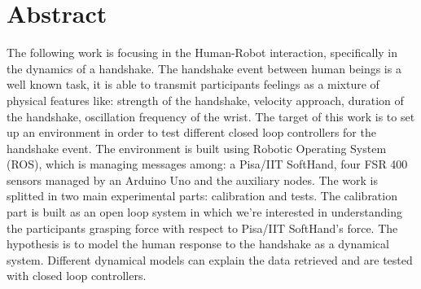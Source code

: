 
\chapter*{Abstract}
\begin{center}

\end{center}
\vspace{60px}
The following work is focusing in the Human-Robot interaction, specifically in the dynamics of a handshake. The handshake event between human beings is a well known task, it is able to transmit participants feelings as a mixture of physical features like: strength of the handshake, velocity approach, duration of the handshake, oscillation frequency of the wrist.
The target of this work is to set up an environment in order to test different closed loop controllers for the handshake event.
The environment is built using Robotic Operating System (ROS), which is managing messages among: a Pisa/IIT SoftHand, four FSR 400 sensors managed by an Arduino Uno and the auxiliary nodes.
The work is splitted in two main experimental parts: calibration and tests. The calibration part is built as an open loop system in which we're interested in understanding the participants grasping force with respect to Pisa/IIT SoftHand's force. The hypothesis is to model the human response to the handshake as a dynamical system. Different dynamical models can explain the data retrieved and are tested with closed loop controllers.
\\


